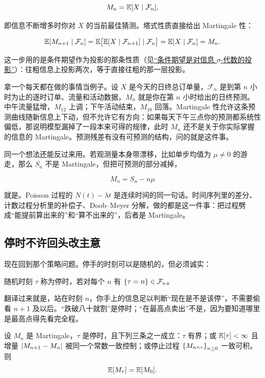\[
M_n=\mathbb{E}[X\mid\mathcal F_n],
\]

即信息不断增多时你对 \(X\) 的当前最佳猜测。塔式性质直接给出 Martingale 性：

\[
\mathbb{E}[M_{n+1}\mid\mathcal F_n]=\mathbb{E}\big[\mathbb{E}[X\mid\mathcal F_{n+1}]\mid\mathcal F_n\big]=\mathbb{E}[X\mid\mathcal F_n]=M_n.
\]

这一步用的是条件期望作为投影的那条性质（见\hyperref[sec:12-Real-Analysis-Support/05-Measure-Integration-and-Conditional-Expectation/05]{``条件期望是对信息 \(\sigma\)-代数的投影''}）：往粗信息上投影两次，等于直接往粗的那一层投影。

拿一个每天都在做的事情当例子。设 \(X\) 是今天的日终总订单量，\(\mathcal F_n\) 是到第 \(n\) 小时为止的逐时订单、流量和活动数据，\(M_n\) 就是你在第 \(n\) 小时给出的日终预测。中午流量猛增，\(M_{12}\) 上调；下午活动结束，\(M_{18}\) 回落。Martingale 性允许这条预测曲线随新信息上下动，但不允许它有方向：如果每天下午三点你的预测都系统性偏低，那说明模型漏掉了一段本来可得的规律，此时 \(M_n\) 还不是关于你实际掌握的信息的 Martingale。预测残差有没有可预测的结构，问的就是这件事。

同一个想法还能反过来用。若观测量本身带漂移，比如单步均值为 \(\mu\neq0\) 的游走，那么 \(S_n\) 不是 Martingale，但把可预测的部分减掉，

\[
M_n=S_n-n\mu
\]

就是。Poisson 过程的 \(N(t)-\lambda t\) 是连续时间的同一句话。时间序列里的差分、计数过程分析里的补偿子、Doob--Meyer 分解，做的都是这一件事：把过程劈成``能提前算出来的''和``算不出来的''，后者是 Martingale。

\subsection{停时不许回头改主意}

现在回到那个策略问题。停手的时刻可以是随机的，但必须诚实：

\begin{definition}
随机时刻 \(\tau\) 称为停时，若对每个 \(n\) 有 \(\left\{\tau=n\right\}\in\mathcal F_n\)。
\end{definition}

翻译过来就是，站在时刻 \(n\)，你手上的信息足以判断``现在是不是该停''，不需要偷看 \(n+1\) 及以后。``跌破八十就割''是停时；``在最高点卖出''不是，因为要知道哪里是最高点得先看完全程。

\begin{theorem}[可选停时定理]
设 \(M_n\) 是 Martingale，\(\tau\) 是停时，且下列三条之一成立：\(\tau\) 有界；或 \(\mathbb{E}[\tau]<\infty\) 且增量 \(\left|M_{n+1}-M_n\right|\) 被同一个常数一致控制；或停止过程 \(\left\{M_{n\wedge\tau}\right\}_{n\ge0}\) 一致可积。则
\[
\mathbb{E}[M_\tau]=\mathbb{E}[M_0].
\]
\end{theorem}


